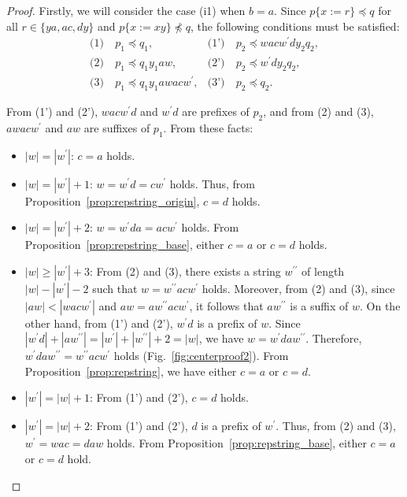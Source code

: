 \begin{proof}
Firstly, we will consider the case (i1) when $b = a$.
Since $p \{ x := r \} \preceq q$ for all $r \in \{ ya, ac, dy \}$ and $p \{ x := xy \} \not\preceq q$, the following conditions must be satisfied:
\begin{align*}
  \textrm{(1)}~& p_{1} \preceq q_{1}, & \textrm{(1')}~& p_{2} \preceq wacw^{\prime}dy_{2}q_{2}, \\
  \textrm{(2)}~& p_{1} \preceq q_{1}y_{1}aw, & \textrm{(2')}~& p_{2} \preceq w^{\prime}dy_{2}q_{2}, \\
  \textrm{(3)}~& p_{1} \preceq q_{1}y_{1}awacw^{\prime}, & \textrm{(3')}~& p_{2} \preceq q_{2}.
\end{align*}

From (1') and (2'), $wacw^{\prime}d$ and $w^{\prime}d$ are prefixes of $p_{2}$, and from (2) and (3), $awacw^{\prime}$ and $aw$ are suffixes of $p_{1}$.
  From these facts:
  \begin{itemize}
  \item $|w|=|w^{\prime}|$: $c = a$ holds.
  \item $|w|=|w^{\prime}|+1$: $w = w^{\prime}d = cw^{\prime}$ holds. Thus, from Proposition~\ref{prop:repstring_origin}, $c = d$ holds.
  \item $|w| = |w^{\prime}|+2$: $w = w^{\prime}da = acw^{\prime}$ holds. From Proposition~\ref{prop:repstring_base}, either $c = a$ or $c = d$ holds.
  \item $|w| \ge |w^{\prime}|+3$: From (2) and (3), there exists a string $w^{\prime\prime}$ of length $|w|-|w^{\prime}|-2$ such that $w=w^{\prime\prime}acw^{\prime}$ holds.
  Moreover, from (2) and (3), since $|aw| < |wacw^{\prime}|$ and $aw = aw^{\prime\prime}acw^{\prime}$, it follows that $aw^{\prime\prime}$ is a suffix of $w$.
  On the other hand, from (1') and (2'), $w^{\prime}d$ is a prefix of $w$.
  Since $|w^{\prime}d| + |aw^{\prime\prime}| = |w^{\prime}| + |w^{\prime\prime}| + 2 = |w|$, we have $w=w^{\prime}daw^{\prime\prime}$.
  Therefore, $w^{\prime}daw^{\prime\prime} = w^{\prime\prime}acw^{\prime}$ holds (Fig.~\ref{fig:centerproof2}).
  From Proposition~\ref{prop:repstring}, we have either $c = a$ or $c = d$.
  \item $|w^{\prime}|=|w|+1$: From (1') and (2'), $c = d$ holds.
  \item $|w^{\prime}| = |w|+2$: From (1') and (2'), $d$ is a prefix of $w^{\prime}$. Thus, from (2) and (3), $w^{\prime} = wac = daw$ holds. From Proposition~\ref{prop:repstring_base}, either $c = a$ or $c = d$ hold.

\end{itemize}
\end{proof}
